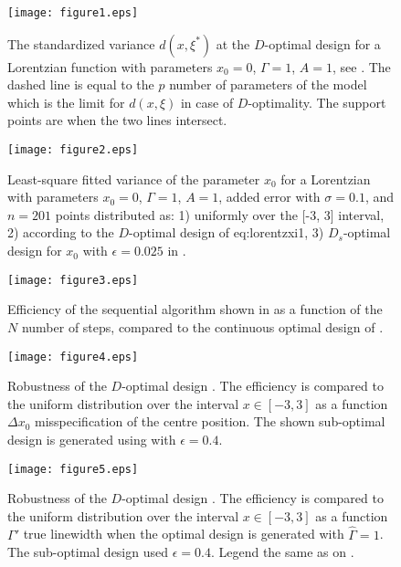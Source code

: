 \documentclass[12pt]{iopart}
\begin{document}
\begin{figure}
\texttt{[image: figure1.eps]}
\caption{The standardized variance $d(x, \xi^*)$ at the $D$-optimal design for a Lorentzian function with parameters $x_0=0$, $\Gamma = 1$, $A = 1$, see . The dashed line is equal to the $p$ number of parameters of the model which is the limit for $d(x, \xi)$ in case of $D$-optimality. The support points are when the two lines intersect.}
\label{fig:lorentz3d}
\end{figure}

\begin{figure}
\texttt{[image: figure2.eps]}
\caption{Least-square fitted variance of the parameter $x_0$ for a Lorentzian with parameters $x_0=0$, $\Gamma = 1$, $A = 1$, added error with $\sigma=0.1$, and $n=201$ points distributed as: 1) uniformly over the [-3, 3] interval, 2) according to the $D$-optimal design of {eq:lorentzxi1}, 3) $D_s$-optimal design for $x_0$ with $\epsilon = 0.025$ in .}
\label{fig:simvariance}
\end{figure}

\begin{figure}
\texttt{[image: figure3.eps]}
\caption{Efficiency of the sequential algorithm shown in  as a function of the $N$ number of steps, compared to the continuous optimal design of .}
\label{fig:xinefficiency}
\end{figure}

\begin{figure}
\texttt{[image: figure4.eps]}
\caption{Robustness of the $D$-optimal design . The efficiency is compared to the uniform distribution over the interval $x\in [-3,3]$ as a function $\Delta x_0$ misspecification of the centre position. The shown sub-optimal design is generated using  with $\epsilon = 0.4$.}
\label{fig:x0robust}
\end{figure}

\begin{figure}
\texttt{[image: figure5.eps]}
\caption{Robustness of the $D$-optimal design . The efficiency is compared to the uniform distribution over the interval $x\in [-3,3]$ as a function $\Gamma'$ true linewidth when the optimal design is generated with $\hat \Gamma = 1$. The sub-optimal design used $\epsilon = 0.4$. Legend the same as on .}
\label{fig:grobust}
\end{figure}
\end{document}
